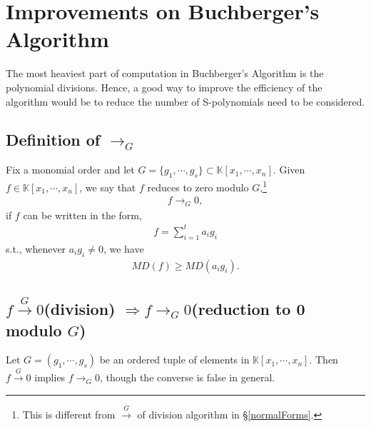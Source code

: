 \documentclass[11pt]{book}
\begin{document}
%

\section{Improvements on Buchberger's Algorithm}
The most heaviest part of computation in Buchberger's Algorithm is the polynomial divisions.
Hence, a good way to improve the efficiency of the algorithm would be to reduce the number of S-polynomials need to be considered.

\subsection{Definition of $\to_G$}
Fix a monomial order and let $G = \{g_1, \cdots, g_s\} \subset \mathbb{K}[x_1, \cdots, x_n]$.
Given $f \in \mathbb{K}[x_1, \cdots, x_n]$, we say that $f$ reduces to zero modulo $G$,\footnote{This is different from $\stackrel{G}{\to}$ of division algorithm in \S\ref{normalForms}.}
\begin{eqnarray}
f \to_G 0,
\end{eqnarray}
if $f$ can be written in the form,
\begin{eqnarray}
f = \sum_{i=1}^t a_i g_i
\end{eqnarray}
s.t., whenever $a_i g_i \neq 0$, we have
\begin{eqnarray}
MD(f) \geq MD(a_i g_i).
\end{eqnarray}

\subsection{$f \stackrel{G}{\to} 0$(division) $\Rightarrow f \to_G 0$(reduction to 0 modulo $G$)}
\label{ModuloR0}
Let $G = (g_1, \cdots, g_s)$ be an ordered tuple of elements in $\mathbb{K}[x_1, \cdots, x_n]$.
Then $f \stackrel{G}{\to} 0$ implies $f \to_G 0$, though the converse is false in general.
\end{document}
